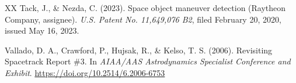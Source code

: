 \documentclass[11pt]{article}
\begin{document}
\begin{thebibliography}{XX}
 Tack, J., \& Nezda, C. (2023). Space object maneuver detection (Raytheon Company, assignee). \emph{U.S. Patent No. 11,649,076 B2}, filed February 20, 2020, issued May 16, 2023.

 Vallado, D. A., Crawford, P., Hujsak, R., \& Kelso, T. S. (2006). Revisiting Spacetrack Report \#3. In \emph{AIAA/AAS Astrodynamics Specialist Conference and Exhibit}. \url{https://doi.org/10.2514/6.2006-6753}


\end{thebibliography}
\end{document}
